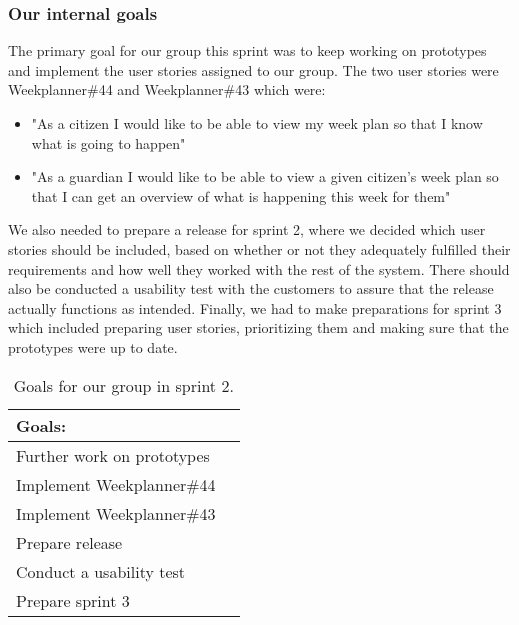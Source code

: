 \subsubsection{Our internal goals}
The primary goal for our group this sprint was to keep working on prototypes and implement the user stories assigned to our group.
The two user stories were Weekplanner\#44 and Weekplanner\#43 which were:
\begin{itemize}
 \item "As a citizen I would like to be able to view my week plan so that I know what is going to happen" 
 \item "As a guardian I would like to be able to view a given citizen's week plan so that I can get an overview of what is happening this week for them"
\end{itemize}
We also needed to prepare a release for sprint 2, where we decided which user stories should be included, based on whether or not they adequately fulfilled their requirements and how well they worked with the rest of the system.
There should also be conducted a usability test with the customers to assure that the release actually functions as intended.
Finally, we had to make preparations for sprint 3 which included preparing user stories, prioritizing them and making sure that the prototypes were up to date.
\begin{table}[H]
    \centering
    \begin{tabular}{|l|l|}
    \hline
    Goals:                                   \\ \hline
    Further work on prototypes              \\ \hline
    Implement Weekplanner\#44               \\ \hline
    Implement Weekplanner\#43               \\ \hline
    Prepare release                          \\ \hline
    Conduct a usability test                   \\ \hline
    Prepare sprint 3                         \\ \hline
    \end{tabular}
    \caption{Goals for our group in sprint 2.}
    \label{PO-goal-sprint-2}
\end{table}
